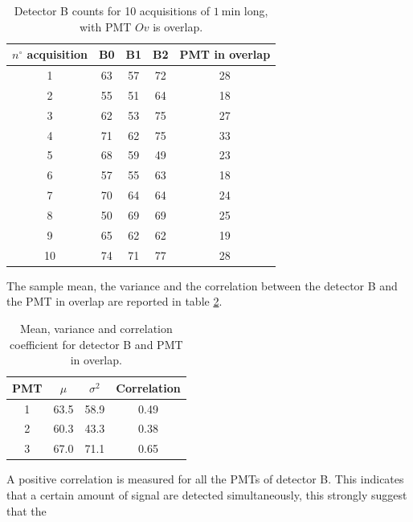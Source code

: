 \begin{table}[ht]
\centering
\begin{tabular}{ccccc}
\hline 
$n^{\circ}$ acquisition  & B0 & B1 & B2 & PMT in overlap \\ 
\hline 
1 & 63 & 57 & 72 & 28 \\ 
 
2 & 55 & 51 & 64 & 18 \\ 
 
3 & 62 & 53 & 75 & 27 \\ 
 
4 & 71 & 62 & 75 & 33 \\ 
 
5 & 68 & 59 & 49 & 23 \\ 
 
6 & 57 & 55 & 63 & 18 \\ 
 
7 & 70 & 64 & 64 & 24 \\ 
 
8 & 50 & 69 & 69 & 25 \\ 
 
9 & 65 & 62 & 62 & 19 \\ 
 
10 & 74 & 71 & 77 & 28 \\ 
\hline
\end{tabular} 
\caption{Detector B counts for 10 acquisitions of $\SI{1}{\minute}$ long, with PMT $Ov$ is overlap.}
\label{tab:OverlapB}
\end{table} 

The sample mean, the variance and the correlation between the detector B and the PMT in overlap are reported in table \ref{tab:ResultBB}.

\begin{table}[ht]
\centering
\begin{tabular}{c|c|c|c}
\hline 
PMT & $\mu$ & $\sigma^{2}$ & Correlation \\
\hline
1 	& 63.5	& 58.9	& 0.49 \\
2 	& 60.3	& 43.3	& 0.38 \\
3	& 67.0	& 71.1  & 0.65 \\
\hline
\end{tabular}
\caption{Mean, variance and correlation coefficient for detector B and PMT in overlap.}
\label{tab:ResultBB}
\end{table}

A positive correlation is measured for all the PMTs of detector B. This indicates that a certain amount of signal are detected simultaneously, this strongly suggest that the 

